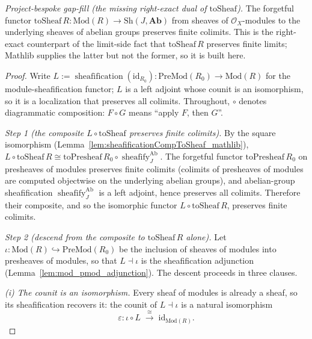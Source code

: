 \begin{lemma}
  \label{lem:toSheaf_preservesFiniteColimits}
  \textit{Project-bespoke gap-fill (the missing right-exact dual of \(\mathrm{toSheaf}\)).}
  The forgetful functor \(\mathrm{toSheaf}\,R : \mathrm{Mod}(R) \to \mathrm{Sh}(J, \mathbf{Ab})\)
  from sheaves of \(\mathcal{O}_X\)-modules to the underlying sheaves of abelian groups preserves
  finite colimits. This is the right-exact counterpart of the limit-side fact that
  \(\mathrm{toSheaf}\,R\) preserves finite limits; Mathlib supplies the latter but not the former, so
  it is built here.
\end{lemma}
\begin{proof}
  Write \(L := \operatorname{sheafification}(\mathrm{id}_{R_0}) : \mathrm{PreMod}(R_0) \to
  \mathrm{Mod}(R)\) for the module-sheafification functor; \(L\) is a left adjoint whose counit is an
  isomorphism, so it is a localization that preserves all colimits. Throughout, \(\circ\) denotes
  diagrammatic composition: \(F \circ G\) means ``apply \(F\), then \(G\)''.

  \emph{Step 1 (the composite \(L \circ \mathrm{toSheaf}\) preserves finite colimits).} By the
  square isomorphism (Lemma~\ref{lem:sheafificationCompToSheaf_mathlib}),
  \(L \circ \mathrm{toSheaf}\,R \cong \mathrm{toPresheaf}\,R_0 \circ
  \operatorname{sheafify}_J^{\mathrm{Ab}}\). The forgetful functor \(\mathrm{toPresheaf}\,R_0\) on
  presheaves of modules preserves finite colimits (colimits of presheaves of modules are computed
  objectwise on the underlying abelian groups), and abelian-group sheafification
  \(\operatorname{sheafify}_J^{\mathrm{Ab}}\) is a left adjoint, hence preserves all colimits.
  Therefore their composite, and so the isomorphic functor \(L \circ \mathrm{toSheaf}\,R\), preserves
  finite colimits.

  \emph{Step 2 (descend from the composite to \(\mathrm{toSheaf}\,R\) alone).} Let
  \(\iota : \mathrm{Mod}(R) \hookrightarrow \mathrm{PreMod}(R_0)\) be the inclusion of sheaves of
  modules into presheaves of modules, so that \(L \dashv \iota\) is the sheafification adjunction
  (Lemma~\ref{lem:mod_pmod_adjunction}). The descent proceeds in three clauses.

  \emph{(i) The counit is an isomorphism.} Every sheaf of modules is already a sheaf, so its
  sheafification recovers it: the counit of \(L \dashv \iota\) is a natural isomorphism
  \[
    \varepsilon : \iota \circ L \;\xrightarrow{\;\cong\;}\; \mathrm{id}_{\mathrm{Mod}(R)} .
  \]


\end{proof}
